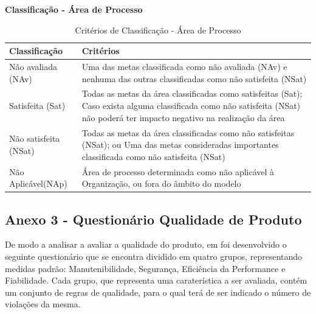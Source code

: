 \documentclass[openany,10pt,a4paper]{article}
\begin{document}
\begin{appendix}
\begin{table}[h]
	\textbf{Classificação - Área de Processo}
		\centering
		\caption{Critérios de Classificação - Área de Processo}
		\begin{tabular}{p{1in}p{5in}}		
			\toprule
			\textbf{Classificação}  & \textbf{Critérios}\\ 
			\midrule
			Não avaliada (NAv) & Uma das metas classificada como não avaliada (NAv) e nenhuma das
			outras classificadas como não satisfeita (NSat) \\
			\midrule
			Satisfeita (Sat) & Todas as metas da área classificadas como satisfeitas (Sat);
			Caso exista alguma classificada como não satisfeita (NSat) não poderá
			ter impacto negativo na realização da área \\
			\midrule
			Não satisfeita (NSat) & Todas as metas da área classificadas como não satisfeitas (NSat); ou
			Uma das metas consideradas importantes classificada como não
			satisfeita (NSat) \\
			\midrule
			Não Aplicável(NAp) & Área de processo determinada como não aplicável à Organização, ou
			fora do âmbito do modelo \\
			\bottomrule
		\end{tabular} 
\end{table}


\subsection{Anexo 3 - Questionário Qualidade de Produto}\label{anexo_produto}
De modo a analisar a avaliar a qualidade do produto, em foi desenvolvido o seguinte questionário que se encontra dividido em quatro grupos, representando medidas padrão: Manutenibilidade, Segurança, Eficiência da Performance e Fiabilidade.
Cada grupo, que representa uma caraterística a ser avaliada, contém um conjunto de regras de qualidade, para o qual terá de ser indicado o número de violações da mesma.


\end{appendix}
\end{document}
